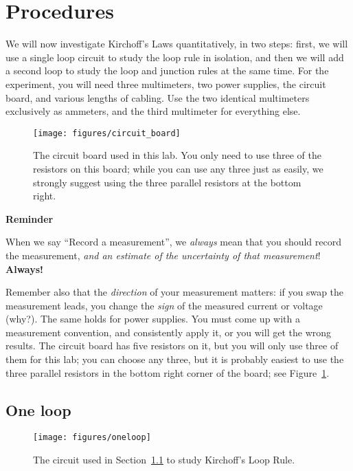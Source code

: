 \documentclass[12pt]{article}
\begin{document}
\section{Procedures}
\label{sec:procedures}

We will now investigate Kirchoff's Laws quantitatively, in two steps:
first, we will use a single loop circuit to study the loop rule in
isolation, and then we will add a second loop to study the loop and
junction rules at the same time.  For the experiment, you will need
three multimeters, two power supplies, the circuit board, and various
lengths of cabling.  Use the two identical multimeters exclusively as
ammeters, and the third multimeter for everything else.

\begin{figure}
  \centering
  \texttt{[image: figures/circuit\_board]}  
  \caption{The circuit board used in this lab.  You only need to use
    three of the resistors on this board; while you can use any three
    just as easily, we strongly suggest using the three parallel
    resistors at the bottom right.}
  \label{fig:circuitboard}
\end{figure}
\begin{framed}
  \begin{center}
    {\Large \textbf{Reminder}}
  \end{center}
  When we say ``Record a measurement'', we \textit{always} mean that
  you should record the measurement, \textit{and an estimate of the
    uncertainty of that measurement}!  \textbf{Always!}
\end{framed}
Remember also that the \textit{direction} of your measurement matters:
if you swap the measurement leads, you change the \textit{sign} of the
measured current or voltage (why?).  The same holds for power
supplies.  You must come up with a measurement convention, and
consistently apply it, or you will get the wrong results.  The circuit
board has five resistors on it, but you will only use three of them
for this lab; you can choose any three, but it is probably easiest to
use the three parallel resistors in the bottom right corner of the
board; see Figure~\ref{fig:circuitboard}.

\subsection{One loop}
\label{sec:oneloop}

\begin{figure}
  \centering
  \texttt{[image: figures/oneloop]}
  \caption{The circuit used in Section~\ref{sec:oneloop} to study
    Kirchoff's Loop Rule.} 
  \label{fig:oneloop}
\end{figure}
\end{document}

